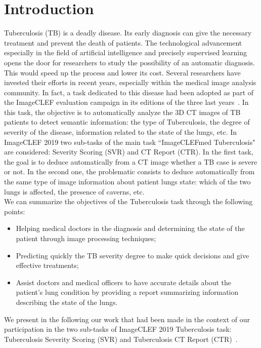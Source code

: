 \documentclass{llncs}
\begin{document}
\section{Introduction}
Tuberculosis (TB) is a deadly disease. Its early diagnosis can give the necessary treatment and prevent the death of patients. The technological advancement especially in the field of artificial intelligence and precisely supervised learning opens the door for researchers to study the possibility of an automatic diagnosis. This would speed up the process and lower its cost. Several researchers have invested their efforts in recent years, especially within the medical image analysis community. In fact, a task dedicated to this disease had been adopted as part of the ImageCLEF evaluation campaign in its editions of the three last years~\cite{ImageCLEFTB2017,ImageCLEFTB2018,ImageCLEFTBoverview2019}. In this task, the objective is to automatically analyze the 3D CT images of TB patients to detect semantic information: the type of Tuberculosis, the degree of severity of the disease, information related to the state of the lungs, etc. In ImageCLEF 2019 two sub-tasks of the main task ``ImageCLEFmed Tuberculosis" are considered: Severity Scoring (SVR) and CT Report (CTR). In the first task, the goal is to deduce automatically from a CT image whether a TB case is severe or not. In the second one, the problematic consists to deduce automatically from the same type of image information about patient lungs state: which of the two lungs is affected, the presence of caverns, etc.\\


We can summarize the objectives of the Tuberculosis task through the following points:

\begin {itemize}
\item Helping medical doctors in the diagnosis and determining the state of the patient through image processing techniques;
\item Predicting quickly the TB severity degree to make quick decisions and give effective treatments;
\item Assist doctors and medical officers to have accurate details about the patient's lung condition by providing a report summarizing information describing the state of the lungs.
\end {itemize}

We present in the following our work that had been made in the context of our participation in the two sub-tasks of ImageCLEF 2019 Tuberculosis task: Tuberculosis Severity Scoring (SVR) and Tuberculosis CT Report (CTR)~\cite{ImageCLEFTBoverview2019}.\\
\end{document}
